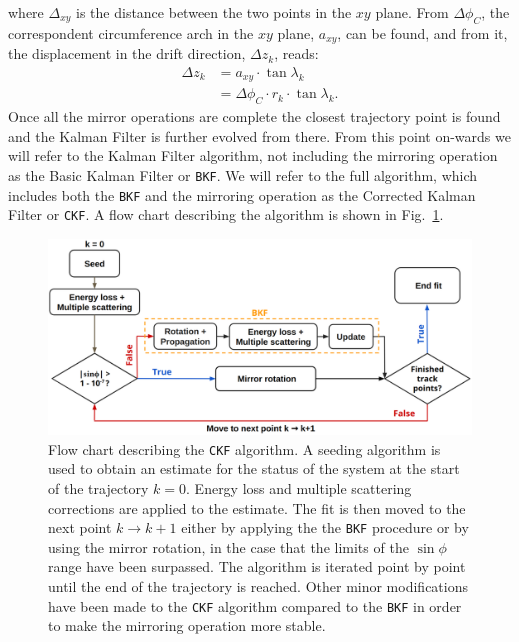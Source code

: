 where $\Delta_{xy}$ is the distance between the two points in the $xy$ plane. From $\Delta \phi_C$, the correspondent circumference arch in the $xy$ plane, $a_{xy}$, can be found, and from it, the displacement in the drift direction, $\Delta z_k$, reads:
\begin{equation}
    \begin{aligned}
        \Delta z_k &= a_{xy} \cdot \tan{\lambda_k} \\
             &= \Delta \phi_C \cdot r_k \cdot \tan{\lambda_k} .
    \end{aligned}  
\end{equation}
Once all the mirror operations are complete the closest trajectory point is found and the Kalman Filter is further evolved from there. From this point on-wards we will refer to the Kalman Filter algorithm, not including the mirroring operation as the Basic Kalman Filter or \texttt{BKF}. We will refer to the full algorithm, which includes both the \texttt{BKF} and the mirroring operation as the Corrected Kalman Filter or \texttt{CKF}. A flow chart describing the algorithm is shown in Fig.~\ref{fig:Logic}.
\begin{figure}[t]
     \centering
     \includegraphics[width=\textwidth]{figures/ch5-KF_NDGAr/KFFlowChart_new.eps}
     \caption[Flow chart describing the \texttt{CKF} algorithm.]{Flow chart describing the \texttt{CKF} algorithm. A seeding algorithm is used to obtain an estimate for the status of the system at the start of the trajectory $k=0$. Energy loss and multiple scattering corrections are applied to the estimate. The fit is then moved to the next point $k\rightarrow k+1$ either by applying the the \texttt{BKF} procedure or by using the mirror rotation, in the case that the limits of the $\sin\phi$ range have been surpassed. The algorithm is iterated point by point until the end of the trajectory is reached. Other minor modifications have been made to the \texttt{CKF} algorithm compared to the \texttt{BKF} in order to make the mirroring operation more stable. }
        \label{fig:Logic}
\end{figure}


